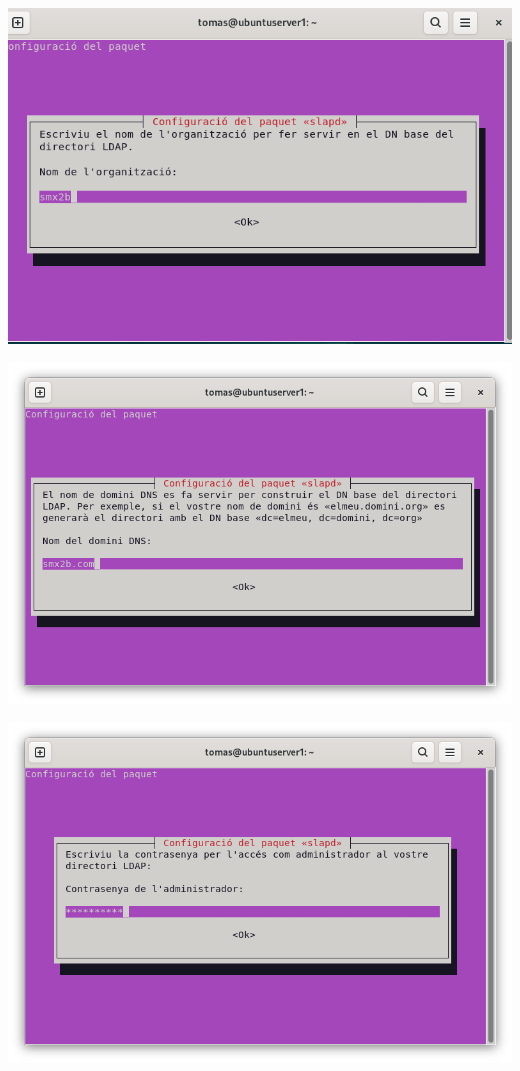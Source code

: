 \documentclass[
  12 pt,
  a4paper,
]{article}
\begin{document}
\includegraphics{png/slapd3.png}

\includegraphics{png/slapdDNS.png}

\includegraphics{png/slapdPASSWORD.png}
\end{document}
